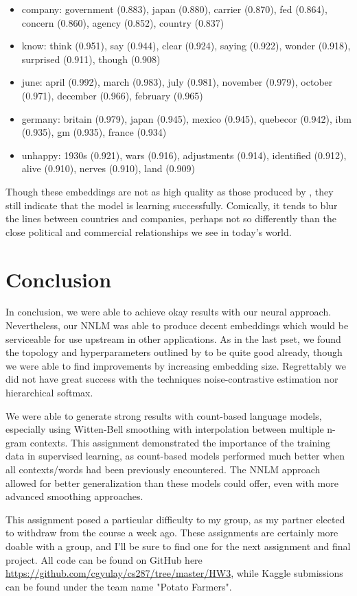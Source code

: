 \documentclass[11pt]{article}
\begin{document}
\begin{itemize}
  \item company: government (0.883), japan (0.880), carrier (0.870), fed (0.864), concern (0.860), agency (0.852), country (0.837)
  \item know: think (0.951), say (0.944), clear (0.924), saying (0.922), wonder (0.918), surprised (0.911), though (0.908)
  \item june: april (0.992), march (0.983), july (0.981), november (0.979), october (0.971), december (0.966), february (0.965)
  \item germany: britain (0.979), japan (0.945), mexico (0.945), quebecor (0.942), ibm (0.935), gm (0.935), france (0.934)
  \item unhappy: 1930s (0.921), wars (0.916), adjustments (0.914), identified (0.912), alive (0.910), nerves (0.910), land (0.909)
\end{itemize}

Though these embeddings are not as high quality as those produced by \citet{DBLP:journals/corr/MikolovSCCD13}, they still indicate that the model is learning successfully. Comically, it tends to blur the lines between countries and companies, perhaps not so differently than the close political and commercial relationships we see in today's world.

\section{Conclusion}

In conclusion, we were able to achieve okay results with our neural approach. Nevertheless, our NNLM was able to produce decent embeddings which would be serviceable for use upstream in other applications. As in the last pset, we found the topology and hyperparameters outlined by \citet{DBLP:journals/jmlr/BengioDVJ03} to be quite good already, though we were able to find improvements by increasing embedding size. Regrettably we did not have great success with the techniques noise-contrastive estimation nor hierarchical softmax.

We were able to generate strong results with count-based language models, especially using Witten-Bell smoothing with interpolation between multiple n-gram contexts. This assignment demonstrated the importance of the training data in supervised learning, as count-based models performed much better when all contexts/words had been previously encountered. The NNLM approach allowed for better generalization than these models could offer, even with more advanced smoothing approaches.

This assignment posed a particular difficulty to my group, as my partner elected to withdraw from the course a week ago. These assignments are certainly more doable with a group, and I'll be sure to find one for the next assignment and final project. All code can be found on GitHub here \url{https://github.com/cgyulay/cs287/tree/master/HW3}, while Kaggle submissions can be found under the team name "Potato Farmers".



\end{document}
